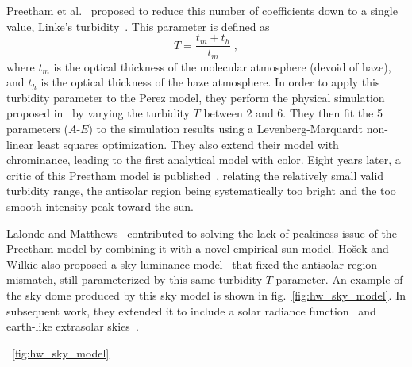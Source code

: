 Preetham et al.~\cite{preetham-siggraph-99} proposed to reduce this number of coefficients down to a single value, Linke's turbidity~\cite{mccartney1976optics}. This parameter is defined as
\begin{equation}
T = \frac{t_m + t_h}{t_m} \;,
\end{equation}
where $t_m$ is the optical thickness of the molecular atmosphere (devoid of haze), and $t_h$ is the optical thickness of the haze atmosphere. In order to apply this turbidity parameter to the Perez model, they perform the physical simulation proposed in~\cite{nishita1996display} by varying the turbidity $T$ between 2 and 6. They then fit the 5 parameters ($A$-$E$) to the simulation results using a Levenberg-Marquardt non-linear least squares optimization. They also extend their model with chrominance, leading to the first analytical model with color. 
Eight years later, a critic of this Preetham model is published~\cite{zotti2007critical}, relating the relatively small valid turbidity range, the antisolar region being systematically too bright and the too smooth intensity peak toward the sun.

Lalonde and Matthews~\cite{lalonde-3dv-14} contributed to solving the lack of peakiness issue of the Preetham model by combining it with a novel empirical sun model. Ho\v{s}ek and Wilkie also proposed a sky luminance model~\cite{hosek-siggraph-12} that fixed the antisolar region mismatch, still parameterized by this same turbidity $T$ parameter. An example of the sky dome produced by this sky model is shown in fig.~\ref{fig:hw_sky_model}. In subsequent work, they extended it to include a solar radiance function~\cite{hosek-cga-13} and earth-like extrasolar skies~\cite{wilkie2013predicting}.

~\ref{fig:hw_sky_model}

